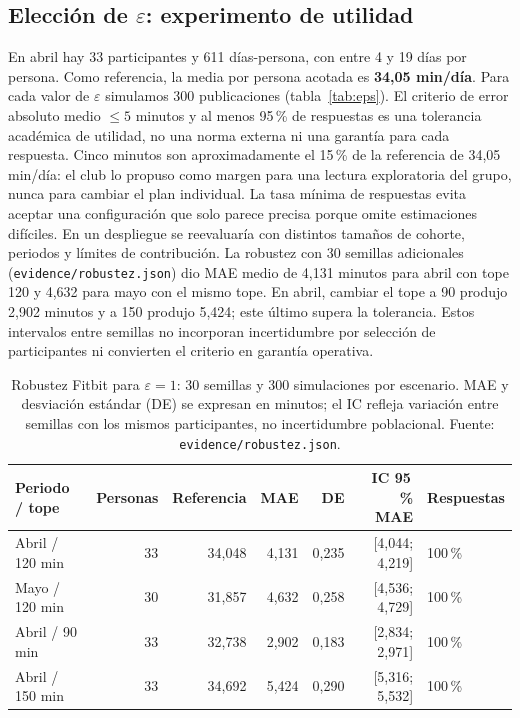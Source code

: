 \documentclass[11pt]{article}
\begin{document}
\subsection{Elección de \texorpdfstring{$\varepsilon$}{epsilon}: experimento de utilidad}
En abril hay 33 participantes y 611 días-persona, con entre 4 y 19 días por persona. Como referencia, la media por persona acotada es \textbf{34,05 min/día}. Para cada valor de $\varepsilon$ simulamos 300 publicaciones (tabla~\ref{tab:eps}).
El criterio de error absoluto medio $\leq 5$ minutos y al menos 95\,\% de respuestas es una tolerancia académica de utilidad, no una norma externa ni una garantía para cada respuesta. Cinco minutos son aproximadamente el 15\,\% de la referencia de 34,05 min/día: el club lo propuso como margen para una lectura exploratoria del grupo, nunca para cambiar el plan individual. La tasa mínima de respuestas evita aceptar una configuración que solo parece precisa porque omite estimaciones difíciles. En un despliegue se reevaluaría con distintos tamaños de cohorte, periodos y límites de contribución.
La robustez con 30 semillas adicionales (\texttt{evidence/robustez.json}) dio MAE medio de 4,131 minutos para abril con tope 120 y 4,632 para mayo con el mismo tope. En abril, cambiar el tope a 90 produjo 2,902 minutos y a 150 produjo 5,424; este último supera la tolerancia. Estos intervalos entre semillas no incorporan incertidumbre por selección de participantes ni convierten el criterio en garantía operativa.

\begin{table}[H]
\centering\small
\begin{tabular}{@{}lrrrrrl@{}}
\toprule
Periodo / tope & Personas & Referencia & MAE & DE & IC 95\,\% MAE & Respuestas \\
\midrule
Abril / 120 min & 33 & 34,048 & 4,131 & 0,235 & [4,044; 4,219] & 100\,\% \\
Mayo / 120 min & 30 & 31,857 & 4,632 & 0,258 & [4,536; 4,729] & 100\,\% \\
Abril / 90 min & 33 & 32,738 & 2,902 & 0,183 & [2,834; 2,971] & 100\,\% \\
Abril / 150 min & 33 & 34,692 & 5,424 & 0,290 & [5,316; 5,532] & 100\,\% \\
\bottomrule
\end{tabular}
\caption{Robustez Fitbit para $\varepsilon=1$: 30 semillas y 300 simulaciones por escenario. MAE y desviación estándar (DE) se expresan en minutos; el IC refleja variación entre semillas con los mismos participantes, no incertidumbre poblacional. Fuente: \texttt{evidence/robustez.json}.}
\label{tab:robustez}
\end{table}
\end{document}
